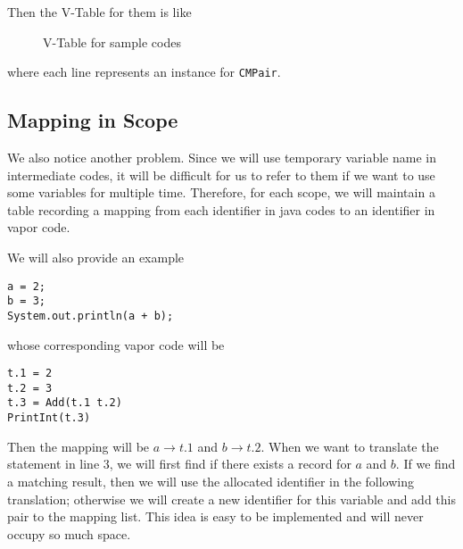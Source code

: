\documentclass[letterpaper, 14pt]{article}
\begin{document}
Then the V-Table for them is like
\begin{figure}[H]
\centering
{}
\caption{V-Table for sample codes}
\end{figure}
where each line represents an instance for \texttt{CMPair}. 

\subsection{Mapping in Scope}

We also notice another problem. Since we will use temporary variable name in intermediate codes, it will be difficult for us to refer to them if we want to use some variables for multiple time. Therefore, for each scope, we will maintain a table recording a mapping from each identifier in java codes to an identifier in vapor code. 

We will also provide an example
\begin{lstlisting}
a = 2;
b = 3;
System.out.println(a + b);
\end{lstlisting}
whose corresponding vapor code will be
\begin{lstlisting}
t.1 = 2
t.2 = 3
t.3 = Add(t.1 t.2)
PrintInt(t.3)
\end{lstlisting}

Then the mapping will be $a\rightarrow t.1$ and $b\rightarrow t.2$. When we want to translate the statement in line 3, we will first find if there exists a record for $a$ and $b$. If we find a matching result, then we will use the allocated identifier in the following translation; otherwise we will create a new identifier for this variable and add this pair to the mapping list. This idea is easy to be implemented and will never occupy so much space. 
\end{document}

